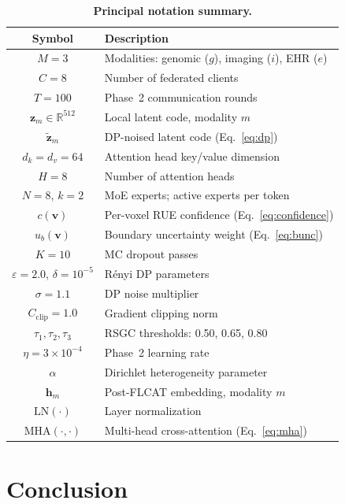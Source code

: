 \documentclass[a4paper,fleqn]{cas-dc}
\begin{document}
\begin{table}[!t]
\caption{\textbf{Principal notation summary.}}
\label{tab:notation}
\centering
\renewcommand{\arraystretch}{1.15}
\setlength{\tabcolsep}{4pt}
\begin{tabular}{cl}
\toprule
\textbf{Symbol} & \textbf{Description}\\
\midrule
$M\!=\!3$ & Modalities: genomic ($g$), imaging ($i$), EHR ($e$)\\
$C\!=\!8$ & Number of federated clients\\
$T\!=\!100$ & Phase~2 communication rounds\\
$\mathbf{z}_m \in \mathbb{R}^{512}$ & Local latent code, modality $m$\\
$\tilde{\mathbf{z}}_m$ & DP-noised latent code (Eq.~\ref{eq:dp})\\
$d_k\!=\!d_v\!=\!64$ & Attention head key/value dimension\\
$H\!=\!8$ & Number of attention heads\\
$N\!=\!8$, $k\!=\!2$ & MoE experts; active experts per token\\
$c(\mathbf{v})$ & Per-voxel RUE confidence (Eq.~\ref{eq:confidence})\\
$u_b(\mathbf{v})$ & Boundary uncertainty weight (Eq.~\ref{eq:bunc})\\
$K\!=\!10$ & MC dropout passes\\
$\varepsilon\!=\!2.0$, $\delta\!=\!10^{-5}$ & R\'{e}nyi DP parameters\\
$\sigma\!=\!1.1$ & DP noise multiplier\\
$C_{\mathrm{clip}}\!=\!1.0$ & Gradient clipping norm\\
$\tau_1,\tau_2,\tau_3$ & RSGC thresholds: 0.50, 0.65, 0.80\\
$\eta\!=\!3\!\times\!10^{-4}$ & Phase~2 learning rate\\
$\alpha$ & Dirichlet heterogeneity parameter\\
$\mathbf{h}_m$ & Post-FLCAT embedding, modality $m$\\
$\mathrm{LN}(\cdot)$ & Layer normalization\\
$\mathrm{MHA}(\cdot,\cdot)$ & Multi-head cross-attention (Eq.~\ref{eq:mha})\\
\bottomrule
\end{tabular}
\end{table}

\section{Conclusion}
\label{sec:conclusion}
\end{document}
